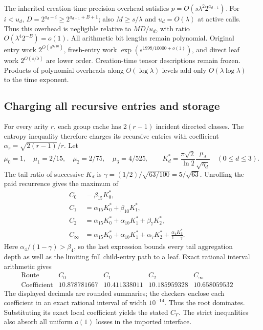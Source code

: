 The inherited creation-time precision overhead satisfies
$p=O(s\lambda^2 2^{a_{d-1}})$. For $i<u_d$,
$D=2^{a_d-i}\ge2^{a_{d-1}+B+1}$; also $M\ge s/\lambda$ and
$u_d=O(\lambda)$ at active calls. Thus this overhead is negligible
relative to $MD/u_d$, with ratio $O(\lambda^4 2^{-B})=o(1)$. All arithmetic bit lengths remain polynomial.
Original entry work $2^{O(s^{9/10})}$, fresh-entry work
$\exp(s^{1999/10000+o(1)})$, and direct leaf work
$2^{O(s/\lambda)}$ are lower order. Creation-time tensor descriptions
remain frozen. Products of polynomial overheads along $O(\log\lambda)$
levels add only $O(\lambda\log\lambda)$ to the time exponent.

\subsection{Charging all recursive entries and storage}

For every arity $r$, each group cache has $2(r-1)$ incident directed
classes. The entropy inequality therefore charges its recursive entries
with coefficient $\alpha_r=\sqrt{2(r-1)}/r$. Let
\[
 \mu_0=1,\quad\mu_1=2/15,\quad\mu_2=2/75,\quad\mu_3=4/525,
 \qquad K_d^*=\frac{\pi\sqrt2}{\ln2}\frac{\mu_d}{\sqrt{\eta_d}}
 \quad(0\le d\le3).
\]
The tail ratio of successive $K_d$ is
$\gamma=(1/2)/\sqrt{63/100}=5/\sqrt{63}$.
Unrolling the paid recurrence gives the maximum of
\begin{align*}
 C_0&=\beta_{15}K_0^*,\\
 C_1&=\alpha_{15}K_0^*+\beta_{10}K_1^*,\\
 C_2&=\alpha_{15}K_0^*+\alpha_{10}K_1^*+\beta_7K_2^*,\\
 C_\infty&=\alpha_{15}K_0^*+\alpha_{10}K_1^*
            +\alpha_7K_2^*+\frac{\alpha_4K_3^*}{1-\gamma}.
\end{align*}
Here $\alpha_4/(1-\gamma)>\beta_4$, so the last expression bounds
every tail aggregation depth as well as the limiting full child-entry
path to a leaf. Exact rational interval arithmetic gives
\[
\begin{array}{c|rrrr}
\text{Route}&C_0&C_1&C_2&C_\infty\\\hline
\text{Coefficient}&10.878781667&10.411338011&10.185959328&10.658059532
\end{array}
\]
The displayed decimals are rounded summaries; the checkers enclose each
coefficient in an exact rational interval of width $10^{-14}$.
Thus the root dominates. Substituting its exact local coefficient yields
the stated $C_T$. The strict inequalities also absorb all uniform $o(1)$
losses in the imported interface.

